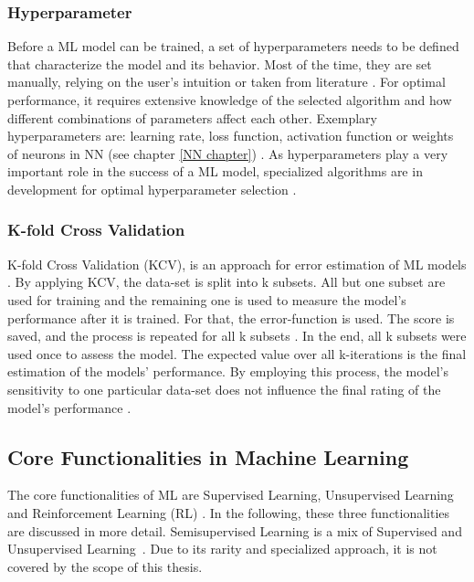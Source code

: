 \subsubsection*{Hyperparameter}
Before a ML model can be trained, a set of hyperparameters needs to be defined that characterize the model and its behavior.
Most of the time, they are set manually, relying on the user's intuition or taken from literature \cite{Philipp}. 
For optimal performance, it requires extensive knowledge of the selected algorithm and how different combinations of parameters affect each other.
Exemplary hyperparameters are: learning rate, loss function, activation function or weights of neurons in NN (see chapter \ref{NN chapter}) \cite{Yang2}.
As hyperparameters play a very important role in the success of a ML model, specialized algorithms are in development for optimal hyperparameter selection \cite{Bergstra}.


\subsubsection*{K-fold Cross Validation}\label{KCV}
K-fold Cross Validation (KCV), is an approach for error estimation of ML models \cite{Zhang}. By applying KCV, the data-set is split into k subsets. All but one subset are used for training and the remaining one is used to measure the model's performance after it is trained. For that, the error-function is used. The score is saved, and the process is repeated for all k subsets \cite{Yoshua}. In the end, all k subsets were used once to assess the model. The expected value over all k-iterations is the final estimation of the models' performance. By employing this process, the model's sensitivity to one particular data-set does not influence the final rating of the model's performance \cite{Bishop}.





\subsection{Core Functionalities in Machine Learning}
The core functionalities of ML are Supervised Learning, Unsupervised Learning and Reinforcement Learning (RL) \cite{Theodoridis,Janiesch}. In the following, these three functionalities are discussed in more detail.
Semisupervised Learning is a mix of Supervised and Unsupervised Learning~\cite{Zhu}. Due to its rarity and specialized approach, it is not covered by the scope of this thesis.

